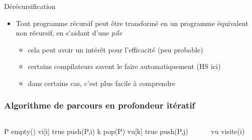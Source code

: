 
\begin{frame}{Dérécursification}

\begin{itemize}
    \item Tout programme récursif peut être transformé en un programme équivalent non récursif, en s'aidant d'une \emph{pile} 
    \begin{itemize}
        \item cela peut avoir un intérêt pour l'efficacité (peu probable)
        \item certains compilateurs savent le faire automatiquement (HS ici) 
        \item dans certains cas, c'est plus facile à comprendre 
    \end{itemize}
\end{itemize}
\end{frame}

\begin{frame}[fragile]
    \frametitle{Algorithme de parcours en profondeur itératif}
        \begin{columns}
            \begin{column}{.55\textwidth}
                \begin{algorithmic}
                    \State P \gets empty() 
                    \State vi[i] \gets true 
                    \State push(P,i) 
                        \State k \gets pop(P)
                            \State vu[k] \gets true 
                            \State push(P,j)
                            \EndIf
                        \EndFor
                    \EndWhile
                    \EndFunction
                \end{algorithmic}
            \end{column}
            \begin{column}{.45\textwidth}
                \begin{algorithmic}
                    \State vu 
                            \State visite(i)
                        \EndIf
                    \EndFor
                \end{algorithmic}            
            \end{column}
        \end{columns}    
    \end{frame}

